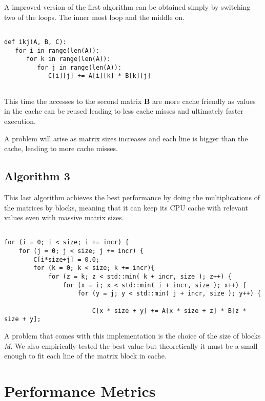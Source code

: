 \documentclass[a4paper]{article}
\begin{document}
A improved version of the first algorithm can be obtained simply by switching two of the loops. The inner most loop and the middle on.

\begin{lstlisting}

def ikj(A, B, C):
   for i in range(len(A)):
      for k in range(len(A)):
         for j in range(len(A)):
            C[i][j] += A[i][k] * B[k][j]
				
\end{lstlisting}

This time the accesses to the second matrix \textbf{B} are more cache friendly as values in the cache can be reused leading to less cache misses and ultimately faster execution. \par
A problem will arise as matrix sizes increases and each line is bigger than the cache, leading to more cache misses.

\subsection{Algorithm 3}

This last algorithm achieves the best performance by doing the multiplications of the matrices by blocks, meaning that it can keep its CPU cache with relevant values even with massive matrix sizes. 
\textbf{}

\lstset{language=C++}
\begin{lstlisting}

for (i = 0; i < size; i += incr) {
    for (j = 0; j < size; j += incr) {
        C[i*size+j] = 0.0;
        for (k = 0; k < size; k += incr){
         	for (z = k; z < std::min( k + incr, size ); z++) {
            	for (x = i; x < std::min( i + incr, size ); x++) {
                	for (y = j; y < std::min( j + incr, size ); y++) {
                 
                        C[x * size + y] += A[x * size + z] * B[z * size + y];

\end{lstlisting}

A problem that comes with this implementation is the choice of the size of blocks \textit{M}. We also empirically tested the best value but theoretically it must be a small enough to fit each line of the matrix block in cache.


\section{Performance Metrics}
\end{document}
